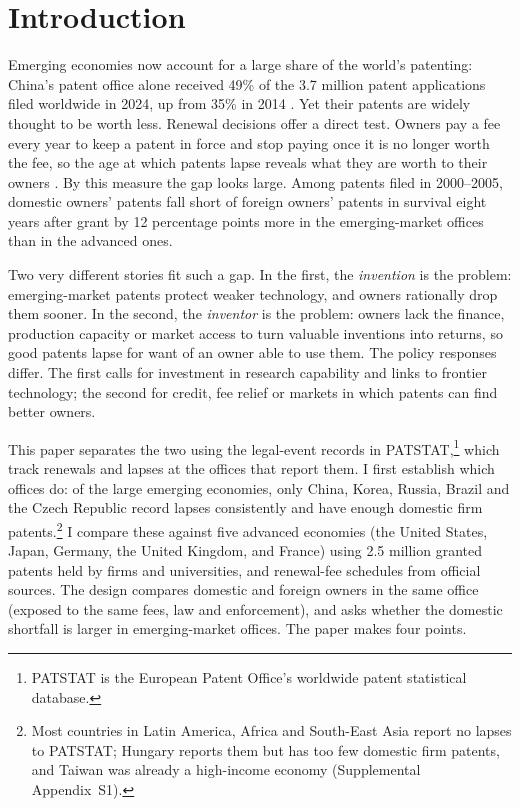 \section{Introduction}

Emerging economies now account for a large share of the world's patenting: China's patent office alone received
49\% of the 3.7 million patent applications filed worldwide in 2024, up from 35\% in 2014 \citep{WIPO2025}. Yet
their patents are widely thought to be worth less. Renewal decisions offer a direct test. Owners pay a fee every year to keep a patent in force and stop paying
once it is no longer worth the fee, so the age at which patents lapse reveals what they are worth to their owners
\citep{PakesSchankerman1984,Pakes1986,SchankermanPakes1986}. By this measure the gap looks large. Among patents
filed in 2000--2005, domestic owners' patents fall short of foreign owners' patents in survival eight years after
grant by 12 percentage points more in the emerging-market offices than in the advanced ones.

Two very different stories fit such a gap. In the first, the \emph{invention} is the problem: emerging-market
patents protect weaker technology, and owners rationally drop them sooner. In the second, the \emph{inventor} is
the problem: owners lack the finance, production capacity or market access to turn valuable inventions into
returns, so good patents lapse for want of an owner able to use them. The policy responses differ. The first calls
for investment in research capability and links to frontier technology; the second for credit, fee relief or
markets in which patents can find better owners.

This paper separates the two using the legal-event records in PATSTAT,\footnote{PATSTAT is the European Patent Office's worldwide patent statistical database.} which track renewals and lapses at the
offices that report them. I first establish which offices do: of the large emerging economies, only China, Korea,
Russia, Brazil and the Czech Republic record lapses consistently and have enough domestic firm
patents.\footnote{Most countries in Latin America, Africa and South-East Asia report no lapses
to PATSTAT; Hungary reports them but has too few domestic firm patents, and Taiwan was already a high-income economy (Supplemental Appendix~S1).}
I compare these against five advanced economies (the United States, Japan, Germany, the United Kingdom, and France) using 2.5 million granted patents held by firms and universities, and renewal-fee schedules from official sources. The design compares domestic and foreign owners in the same office (exposed to the same fees, law and
enforcement), and asks whether the domestic shortfall is larger in emerging-market offices. The paper makes four
points.

